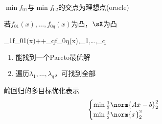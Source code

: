 $\min f_{01}$与$\min f_{02}$的交点为理想点(oracle)

若$f_{01}(x),\ldots,f_{0q}(x)$为凸，$\sX$为凸
\begin{mini*}[2]
{}{\lambda_1f_{01}(x)+\cdots+\lambda_qf_{0q}(x),\quad\lambda_1,\ldots,\lambda_q}
{}{}
\end{mini*}
\begin{enumerate}
	\item 能找到一个Pareto最优解
	\item 遍历$\lambda_1,\ldots,\lambda_q$，可找到全部
\end{enumerate}

岭回归的多目标优化表示
\[\begin{cases}
	\min \frac{1}{2}\norm{Ax-b}_2^2\\
	\min \frac{1}{2}\norm{x}_2^2
\end{cases}\]